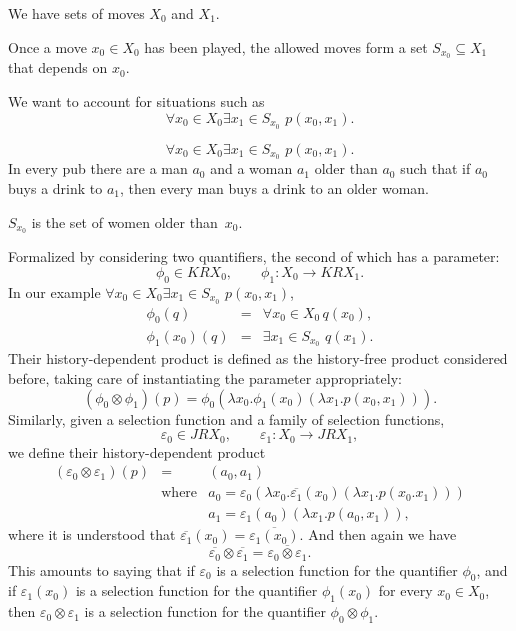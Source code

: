 


We have sets of moves $X_0$ and $X_1$. 

Once a move $x_0
\in X_0$ has been played, the allowed moves form a set $S_{x_0}
\subseteq X_1$ that depends on $x_0$. 

\vfill

We want to account for situations such as
\[
\forall x_0 \in X_0 \exists x_1 \in S_{x_0} \,\,p(x_0,x_1).
\]


\[
\forall x_0 \in X_0 \exists x_1 \in S_{x_0} \,\,p(x_0,x_1).
\]
In every pub there are a man $a_0$ and a woman $a_1$
older than $a_0$ such that if $a_0$ buys a drink to $a_1$, then every
man buys a drink to an older woman. 


$S_{x_0}$ is the set of women
older than~$x_0$. 

Formalized by considering two
quantifiers, the second of which has a parameter:
\[
\phi_0 \in K R X_0, \qquad \phi_1 \colon X_0 \to K R X_1.
\]
In our example $\forall x_0 \in X_0 \exists x_1 \in S_{x_0} \,\,p(x_0,x_1)$,
\begin{eqnarray*}
\phi_0(q) & = & \forall x_0 \in X_0 \, q(x_0), \\
\phi_1(x_0)(q) & = & \exists x_1 \in S_{x_0} \,\,q(x_1).
\end{eqnarray*}
Their history-dependent product is defined as the history-free product
considered before, taking care of instantiating the parameter
appropriately:
\[
(\phi_0 \otimes \phi_1)(p)=\phi_0(\lambda x_0.\phi_1(x_0)(\lambda x_1.p(x_0,x_1))).
\]
Similarly, given a selection function and a family of selection functions,
\[
\varepsilon_0 \in J R X_0, \qquad \varepsilon_1 \colon X_0 \to J R X_1,
\]
we define their history-dependent product
\begin{eqnarray*}
  (\varepsilon_0 \otimes \varepsilon_1)(p) & = & (a_0,a_1) \\
        & \text{where} & a_0 = \varepsilon_0(\lambda x_0.\overline{\varepsilon_1}(x_0)(\lambda x_1.p(x_0.x_1))) \\
        & & a_1 = \varepsilon_1(a_0)(\lambda x_1.p(a_0,x_1)),
\end{eqnarray*}
where it is understood that $\overline{\varepsilon_1}(x_0) =
\overline{\varepsilon_1(x_0)}$.  And then again we have
\[
\overline{\varepsilon_0} \otimes \overline{\varepsilon_1}
= \overline{\varepsilon_0 \otimes \varepsilon_1}.
\]
This amounts to saying that if $\varepsilon_0$ is a selection
function for the quantifier $\phi_0$, and if $\varepsilon_1(x_0)$ is a
selection function for the quantifier $\phi_1(x_0)$ for every $x_0 \in
X_0$, then $\varepsilon_0 \otimes \varepsilon_1$ is a selection
function for the quantifier $\phi_0 \otimes \phi_1$.

